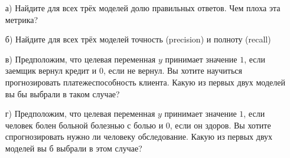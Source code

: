 \documentclass[12pt, a4paper, oneside]{article}
\begin{document}
\begin{enumerate}
	\item[а)]   Найдите для всех трёх моделей долю правильных ответов. Чем плоха эта метрика? 
	\item[б)]   Найдите для всех трёх моделей точность (precision) и полноту (recall)
	\item[в)]   Предположим, что целевая переменная $y$ принимает значение $1$, если заемщик вернул кредит  и $0$, если не вернул. Вы хотите научиться прогнозировать платежеспособность клиента. Какую из первых двух моделей вы бы выбрали в таком случае? 
	\item[г)]  Предположим, что целевая переменная $y$ принимает значение $1$, если человек болен больной болезнью с болью и $0$, если он здоров. Вы хотите спрогнозировать нужно ли человеку обследование. Какую из первых двух моделей вы б выбрали в этом случае? 
\end{enumerate}
\end{document}
